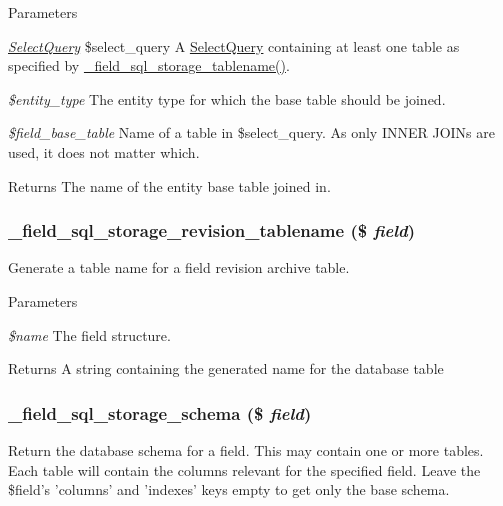 \begin{DoxyParams}{Parameters}
\item[{\em \hyperlink{classSelectQuery}{SelectQuery}}]\$select\_\-query A \hyperlink{classSelectQuery}{SelectQuery} containing at least one table as specified by \hyperlink{field__sql__storage_8module_acf3b24c3e8026009fd962f450c5228ee}{\_\-field\_\-sql\_\-storage\_\-tablename()}. \item[{\em \$entity\_\-type}]The entity type for which the base table should be joined. \item[{\em \$field\_\-base\_\-table}]Name of a table in \$select\_\-query. As only INNER JOINs are used, it does not matter which.\end{DoxyParams}
\begin{DoxyReturn}{Returns}
The name of the entity base table joined in. 
\end{DoxyReturn}
\hypertarget{field__sql__storage_8module_a7305341c2bf84cf2490a4e4b9886435b}{
\subsubsection[{\_\-field\_\-sql\_\-storage\_\-revision\_\-tablename}]{\setlength{\rightskip}{0pt plus 5cm}\_\-field\_\-sql\_\-storage\_\-revision\_\-tablename (\$ {\em field})}}
\label{field__sql__storage_8module_a7305341c2bf84cf2490a4e4b9886435b}
Generate a table name for a field revision archive table.


\begin{DoxyParams}{Parameters}
\item[{\em \$name}]The field structure. \end{DoxyParams}
\begin{DoxyReturn}{Returns}
A string containing the generated name for the database table 
\end{DoxyReturn}
\hypertarget{field__sql__storage_8module_ae0a47fa05ecb671a55ca6b96fb092668}{
\subsubsection[{\_\-field\_\-sql\_\-storage\_\-schema}]{\setlength{\rightskip}{0pt plus 5cm}\_\-field\_\-sql\_\-storage\_\-schema (\$ {\em field})}}
\label{field__sql__storage_8module_ae0a47fa05ecb671a55ca6b96fb092668}
Return the database schema for a field. This may contain one or more tables. Each table will contain the columns relevant for the specified field. Leave the \$field's 'columns' and 'indexes' keys empty to get only the base schema.


